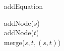 \begin{algorithm}[t]
\caption[.]{addEquation}
	
	addNode($s$) \\
	addNode($t$) \\
	merge($s, t, (s,t)$)
  
  \label{algo:addEquation}
\end{algorithm}
